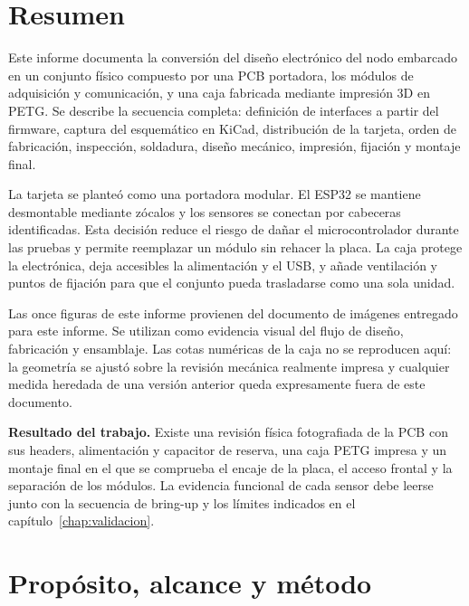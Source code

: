 \documentclass[11pt,a4paper,oneside]{report}
\begin{document}

\chapter*{Resumen}

Este informe documenta la conversión del diseño electrónico del nodo embarcado en
un conjunto físico compuesto por una PCB portadora, los módulos de adquisición y
comunicación, y una caja fabricada mediante impresión 3D en PETG. Se describe la
secuencia completa: definición de interfaces a partir del firmware, captura del
esquemático en KiCad, distribución de la tarjeta, orden de fabricación, inspección,
soldadura, diseño mecánico, impresión, fijación y montaje final.

La tarjeta se planteó como una portadora modular. El ESP32 se mantiene desmontable
mediante zócalos y los sensores se conectan por cabeceras identificadas. Esta
decisión reduce el riesgo de dañar el microcontrolador durante las pruebas y permite
reemplazar un módulo sin rehacer la placa. La caja protege la electrónica, deja
accesibles la alimentación y el USB, y añade ventilación y puntos de fijación para
que el conjunto pueda trasladarse como una sola unidad.

Las once figuras de este informe provienen del documento de imágenes entregado para
este informe. Se utilizan como evidencia visual del flujo de diseño, fabricación y
ensamblaje. Las cotas numéricas de la caja no se reproducen aquí: la geometría se
ajustó sobre la revisión mecánica realmente impresa y cualquier medida heredada de
una versión anterior queda expresamente fuera de este documento.

\begin{evidenciabox}
\textbf{Resultado del trabajo.} Existe una revisión física fotografiada de la PCB
con sus headers, alimentación y capacitor de reserva, una caja PETG impresa y un
montaje final en el que se comprueba el encaje de la placa, el acceso frontal y la
separación de los módulos. La evidencia funcional de cada sensor debe leerse junto
con la secuencia de bring-up y los límites indicados en el capítulo~\ref{chap:validacion}.
\end{evidenciabox}

\tableofcontents
\clearpage
{}

\chapter{Propósito, alcance y método}
\end{document}
